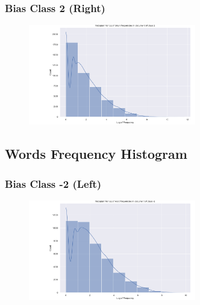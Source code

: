 \documentclass[11pt]{article}
\begin{document}
\subsubsection{Bias Class 2 (Right)}
\begin{center}


\TTTFIDFTable
\begin{figure}[h!]
  \includegraphics[width=0.65\textwidth]{figs/words_histogram/hist_token_2.png}
\end{figure}
\end{center}

\pagebreak

\subsection{Words Frequency Histogram}
\subsubsection{Bias Class -2 (Left)}
\begin{center}


\TTTFIDFTable
\begin{figure}[h!]
  \includegraphics[width=0.65\textwidth]{figs/words_histogram/hist_word_-2.png}
\end{figure}
\end{center}
\end{document}
